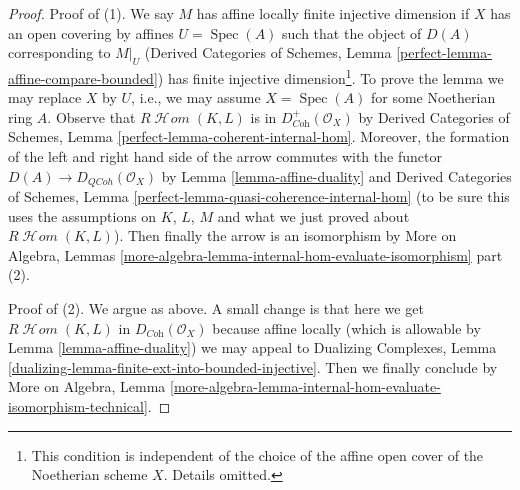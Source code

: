 \documentclass[10pt,a4paper]{amsart}
\theoremstyle{plain}
\theoremstyle{definition}
\theoremstyle{remark}
\numberwithin{equation}{subsection}
\def\Spec{\mathop{\mathrm{Spec}}}
\def\SheafHom{\mathop{\mathcal{H}\!\mathit{om}}\nolimits}
\def\QCoh{\mathit{QCoh}}
\begin{document}
\begin{proof}
Proof of (1). We say $M$ has affine locally finite injective dimension
if $X$ has an open covering by affines $U = \Spec(A)$ such that the object
of $D(A)$ corresponding to $M|_U$ (Derived Categories of Schemes, Lemma
\ref{perfect-lemma-affine-compare-bounded})
has finite injective dimension\footnote{This condition is independent of the
choice of the affine open cover of the Noetherian scheme $X$.
Details omitted.}. To prove the lemma we may
replace $X$ by $U$, i.e., we may assume $X = \Spec(A)$
for some Noetherian ring $A$. Observe that
$R\SheafHom(K, L)$ is in $D^+_{\textit{Coh}}(\mathcal{O}_X)$ by
Derived Categories of Schemes, Lemma
\ref{perfect-lemma-coherent-internal-hom}.
Moreover, the formation of the left and right hand side
of the arrow commutes with the functor $D(A) \to D_\QCoh(\mathcal{O}_X)$ by
Lemma \ref{lemma-affine-duality} and
Derived Categories of Schemes, Lemma
\ref{perfect-lemma-quasi-coherence-internal-hom}
(to be sure this uses the assumptions on $K$, $L$, $M$ and what we just
proved about $R\SheafHom(K, L)$).
Then finally the arrow is an isomorphism by
More on Algebra, Lemmas
\ref{more-algebra-lemma-internal-hom-evaluate-isomorphism} part (2).

\medskip\noindent
Proof of (2). We argue as above. A small change is that here we get
$R\SheafHom(K, L)$ in $D_{\textit{Coh}}(\mathcal{O}_X)$ because
affine locally (which is allowable by Lemma \ref{lemma-affine-duality})
we may appeal to Dualizing Complexes, Lemma
\ref{dualizing-lemma-finite-ext-into-bounded-injective}.
Then we finally conclude by
More on Algebra, Lemma
\ref{more-algebra-lemma-internal-hom-evaluate-isomorphism-technical}.
\end{proof}
\end{document}
